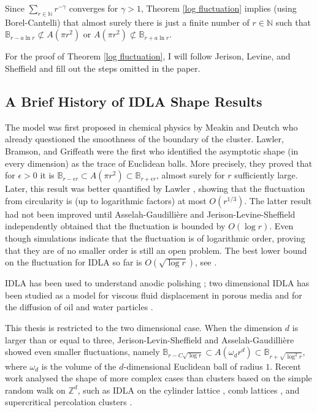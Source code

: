 \documentclass[11pt]{article}
\numberwithin{equation}{section}
\begin{document}
Since $\sum_{r \in \mathbb{N}} r^{-\gamma}$ converges for 
$\gamma > 1$, 
Theorem \ref{log fluctuation} implies 
(using Borel-Cantelli) 
that almost surely there is just a finite number 
of $r \in \mathbb{N}$ such that 
$\mathbb{B}_{r - a \ln r} \not\subset A(\pi r^2)$ 
or $A(\pi r^2) \not\subset \mathbb{B}_{r+ a \ln r}$. 

For the proof of Theorem \ref{log fluctuation},  
I will follow Jerison, Levine, and Sheffield \cite{jerison} 
and fill out the steps omitted in the paper.


\subsection{A Brief History of IDLA Shape Results}
The model was first proposed in chemical physics by 
Meakin and Deutch \cite{meakinDeutsch} who already 
questioned the smoothness of the boundary of the cluster. 
Lawler, Bramson, and Griffeath \cite{lawler92} were 
the first who identified the asymptotic shape (in every dimension)
as the trace of Euclidean balls.
More precisely, they proved that for $\epsilon > 0$ it is 
\hbox{$\mathbb{B}_{r - \epsilon r} 
\subset A(\pi r^2)
\subset \mathbb{B}_{r+\epsilon r}$}, 
almost surely
for $r$ sufficiently large. 
Later, this result was better quantified by Lawler \cite{lawler95}, 
showing that the fluctuation from circularity is 
(up to logarithmic factors) at most  
$O(r^{1/3})$. 
The latter result had not been 
improved until  
Asselah-Gaudillière \cite{gaudilliere} 
and 
Jerison-Levine-Sheffield \cite{jerison} independently obtained 
that the fluctuation is bounded by $O(\log r)$.
Even though simulations \cite{levineSimulations}
indicate that the fluctuation is of logarithmic order, 
proving that they are of no smaller order 
is still an open problem. The best lower bound on
the fluctuation for IDLA so far is $O(\sqrt{ \log r})$, see \cite{asselah2011lower}.

IDLA has been used to understand 
anodic polishing \cite{meakinDeutsch}; 
two dimensional IDLA has been studied  
as a model for viscous fluid displacement in 
porous media \cite{PatersonFluids,ChaoTangFluids} 
and for the diffusion of oil and water particles 
\cite{CandelleroWater}.

This thesis is restricted to the two dimensional case.
When the dimension $d$ is larger than or 
equal to three, Jerison-Levin-Sheffield \cite{jerison} and 
Asselah-Gaudillière \cite{gaudilliereSublog} 
showed even smaller fluctuations, namely 
\hbox{$\mathbb{B}_{r-C \sqrt{\log r}} 
\subset A(\omega_d r^d) \subset 
\mathbb{B}_{r+\sqrt{\log^2 r}}$}, where 
$\omega_d$ is the volume of
the $d$-dimensional Euclidean ball of radius $1$.
Recent work analysed the shape of more complex cases than 
clusters based on the simple random walk on 
$\mathbb{Z}^d$, such as IDLA on the cylinder lattice \cite{JLScylinders}, 
comb lattices \cite{HussChomb}, and
supercritical percolation clusters \cite{percolationClusters}.
\end{document}
